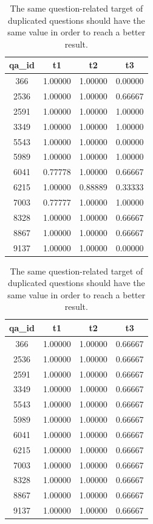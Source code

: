    \begin{table}
        \centering
        \caption{The same question-related target of duplicated questions should have the same value in order to reach a better result.}
        \label{tbl:dp_before}
        \begin{minipage}{0.48\linewidth}
        \begin{tabular}{cccc}
            \hline
            qa_id	&t1 &t2 &t3 \\
            \hline
            366	    &1.00000 &1.00000 &0.00000\\
            2536	&1.00000 &1.00000 &0.66667\\
            2591	&1.00000 &1.00000 &1.00000\\
            3349	&1.00000 &1.00000 &1.00000\\
            5543	&1.00000 &1.00000 &0.00000\\
            5989	&1.00000 &1.00000 &1.00000\\
            6041	&0.77778 &1.00000 &0.66667\\
            6215	&1.00000 &0.88889 &0.33333\\
            7003	&0.77777 &1.00000 &1.00000\\
            8328	&1.00000 &1.00000 &0.66667\\
            8867	&1.00000 &1.00000 &0.66667\\
            9137	&1.00000 &1.00000 &0.00000\\
            \hline
        \end{tabular}
    \end{minipage}
    \begin{minipage}{0.48\linewidth}
        \begin{tabular}{cccc}
            \hline
            qa_id	&t1 &t2 &t3 \\
            \hline
            366	    &1.00000	&1.00000	&0.66667\\
            2536	&1.00000	&1.00000	&0.66667\\
            2591	&1.00000	&1.00000	&0.66667\\
            3349	&1.00000	&1.00000	&0.66667\\
            5543	&1.00000	&1.00000	&0.66667\\
            5989	&1.00000	&1.00000	&0.66667\\
            6041	&1.00000	&1.00000	&0.66667\\
            6215	&1.00000	&1.00000	&0.66667\\
            7003	&1.00000	&1.00000	&0.66667\\
            8328	&1.00000	&1.00000	&0.66667\\
            8867	&1.00000	&1.00000	&0.66667\\
            9137	&1.00000	&1.00000	&0.66667\\
            \hline
        \end{tabular}
    \end{minipage}
    \end{table}
